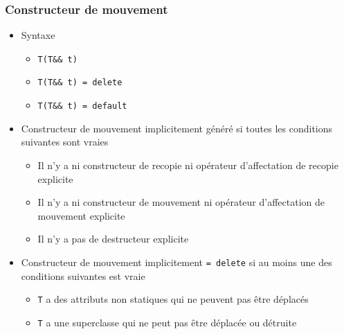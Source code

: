 \begin{frame}
\frametitle{Constructeur de mouvement}
\begin{itemize}[<+->]
\item Syntaxe
	\begin{itemize}
	\item \lstinline|T(T&& t)|
	\item \lstinline|T(T&& t) = delete|
	\item \lstinline|T(T&& t) = default|
	\end{itemize}
\item Constructeur de mouvement implicitement généré si toutes les conditions suivantes sont vraies
	\begin{itemize}
	\item Il n'y a ni constructeur de recopie ni opérateur d'affectation de recopie explicite
	\item Il n'y a ni constructeur de mouvement ni opérateur d'affectation de mouvement explicite
	\item Il n'y a pas de destructeur explicite
	\end{itemize}
\item Constructeur de mouvement implicitement \lstinline|= delete| si au moins une des conditions suivantes est vraie
	\begin{itemize}
	\item \texttt{T} a des attributs non statiques qui ne peuvent pas être déplacés
	\item \texttt{T} a une superclasse qui ne peut pas être déplacée ou détruite
	\end{itemize}
\end{itemize}
\end{frame}

